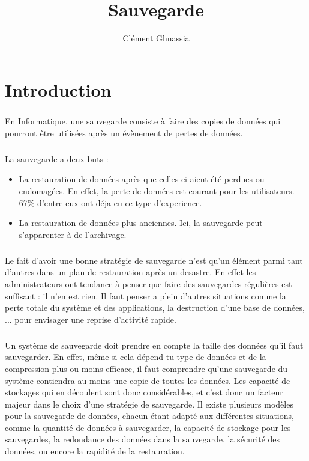 \documentclass[a4paper,11pt]{report}
\title{Sauvegarde}
\author{Clément Ghnassia}
\begin{document}
\maketitle


\chapter{Introduction}

\paragraph{}
En Informatique, une sauvegarde consiste à faire des copies de données qui pourront être utilisées après un évènement de pertes de données.

\paragraph{}
La sauvegarde a deux buts :
\begin{itemize}
  \item La restauration de données après que celles ci aient été perdues ou endomagées. En effet, la perte de données est courant pour les utilisateurs. 67\% d'entre eux ont déja eu ce type d'experience.
  \item La restauration de données plus anciennes. Ici, la sauvegarde peut s'apparenter à de l'archivage.
\end{itemize}

\paragraph{}
Le fait d'avoir une bonne stratégie de sauvegarde n'est qu'un élément parmi tant d'autres dans un plan de restauration après un desastre. En effet les administrateurs ont tendance à penser que faire des sauvegardes régulières est suffisant : il n'en est rien.
Il faut penser a plein d'autres situations comme la perte totale du système et des applications, la destruction d'une base de données, ... pour envisager une reprise d'activité rapide.

\paragraph{}
Un système de sauvegarde doit prendre en compte la taille des données qu'il faut sauvegarder. En effet, même si cela dépend tu type de données et de la compression plus ou moins efficace, il faut comprendre qu'une sauvegarde du système contiendra au moins une copie de toutes les données.
Les capacité de stockages qui en découlent sont donc considérables, et c'est donc un facteur majeur dans le choix d'une stratégie de sauvegarde.
Il existe plusieurs modèles pour la sauvegarde de données, chacun étant adapté aux différentes situations, comme la quantité de données à sauvegarder, la capacité de stockage pour les sauvegardes, la redondance des données dans la sauvegarde, la sécurité des données, ou encore la rapidité de la restauration.
\end{document}
